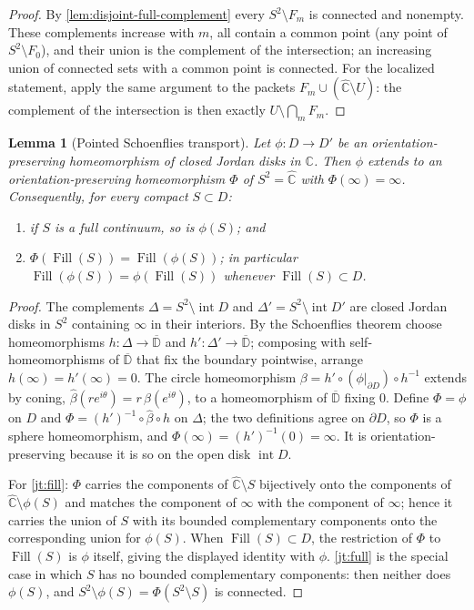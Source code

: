 \documentclass[11pt,reqno]{amsart}
\numberwithin{equation}{section}
\theoremstyle{plain}
\newtheorem{lemma}[theorem]{Lemma}
\theoremstyle{definition}
\theoremstyle{remark}
\DeclareMathOperator{\Fill}{Fill}
\newcommand{\Chat}{\widehat{\mathbb C}}
\newcommand{\C}{\mathbb C}
\begin{document}
\begin{proof}
By \cref{lem:disjoint-full-complement} every $S^2\setminus F_m$ is
connected and nonempty.  These complements increase with $m$, all
contain a common point (any point of $S^2\setminus F_0$), and their
union is the complement of the intersection; an increasing union of
connected sets with a common point is connected.  For the localized
statement, apply the same argument to the packets
$F_m\cup(\Chat\setminus U)$: the complement of the intersection is then
exactly $U\setminus\bigcap_mF_m$.
\end{proof}

\begin{lemma}[Pointed Schoenflies transport]
\label{lem:jordan-transport}
Let $\phi\colon D\to D'$ be an orientation-preserving homeomorphism of
closed Jordan disks in $\C$.  Then $\phi$ extends to an
orientation-preserving homeomorphism $\Phi$ of $S^2=\Chat$ with
$\Phi(\infty)=\infty$.  Consequently, for every compact $S\subset D$:
\begin{enumerate}[label=\textup{(\alph*)}]
 \item \label{jt:full} if $S$ is a full continuum, so is $\phi(S)$; and
 \item \label{jt:fill}
  $\Phi(\Fill(S))=\Fill(\phi(S))$; in particular
  $\Fill(\phi(S))=\phi(\Fill(S))$ whenever $\Fill(S)\subset D$.
\end{enumerate}
\end{lemma}

\begin{proof}
The complements $\Delta=S^2\setminus\operatorname{int}D$ and
$\Delta'=S^2\setminus\operatorname{int}D'$ are closed Jordan disks in
$S^2$ containing $\infty$ in their interiors.  By the Schoenflies
theorem choose homeomorphisms $h\colon\Delta\to\overline{\mathbb D}$ and
$h'\colon\Delta'\to\overline{\mathbb D}$; composing with
self-homeomorphisms of $\overline{\mathbb D}$ that fix the boundary
pointwise, arrange $h(\infty)=h'(\infty)=0$.  The circle homeomorphism
$\beta=h'\circ(\phi|_{\partial D})\circ h^{-1}$ extends by coning,
$\widehat\beta(re^{i\theta})=r\,\beta(e^{i\theta})$, to a homeomorphism
of $\overline{\mathbb D}$ fixing $0$.  Define $\Phi=\phi$ on $D$ and
$\Phi=(h')^{-1}\circ\widehat\beta\circ h$ on $\Delta$; the two
definitions agree on $\partial D$, so $\Phi$ is a sphere homeomorphism,
and $\Phi(\infty)=(h')^{-1}(0)=\infty$.  It is orientation-preserving
because it is so on the open disk $\operatorname{int}D$.

For \ref{jt:fill}: $\Phi$ carries the components of $\Chat\setminus S$
bijectively onto the components of $\Chat\setminus\phi(S)$ and matches
the component of $\infty$ with the component of $\infty$; hence it
carries the union of $S$ with its bounded complementary components onto
the corresponding union for $\phi(S)$.  When $\Fill(S)\subset D$, the
restriction of $\Phi$ to $\Fill(S)$ is $\phi$ itself, giving the
displayed identity with $\phi$.  \ref{jt:full} is the special case in
which $S$ has no bounded complementary components: then neither does
$\phi(S)$, and $S^2\setminus\phi(S)=\Phi(S^2\setminus S)$ is connected.
\end{proof}
\end{document}
